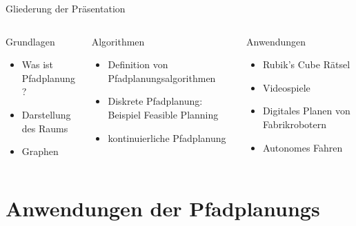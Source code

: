 \documentclass[t,aspectratio=169,dvipsnames]{beamer}
\begin{document}
\begin{frame}{Gliederung der Präsentation}
	\begin{columns}[T]
		\begin{column}[T]{0.33\textwidth}
			\begin{block}{Grundlagen}
				\begin{itemize}
					\item Was ist Pfadplanung?
					\item Darstellung des Raums
					\item Graphen
					\newline\newline\newline
				\end{itemize}
			\end{block}
		\end{column}
		\begin{column}[T]{0.33\textwidth}
			\begin{block}{Algorithmen}
				\begin{itemize}
					\item Definition von Pfadplanungsalgorithmen
					\item Diskrete Pfadplanung: Beispiel Feasible Planning
					\item kontinuierliche Pfadplanung
				\end{itemize}
			\end{block}
		\end{column}
		\begin{column}[T]{0.33\textwidth}
			\begin{block}{Anwendungen}
				\begin{itemize}
					\item Rubik's Cube Rätsel
					\item Videospiele
					\item Digitales Planen von Fabrikrobotern
					\item Autonomes Fahren
					\newline\newline
				\end{itemize}		
			\end{block}
		\end{column}
	\end{columns}	
\end{frame}
\section{Anwendungen der Pfadplanungs}
\end{document}
